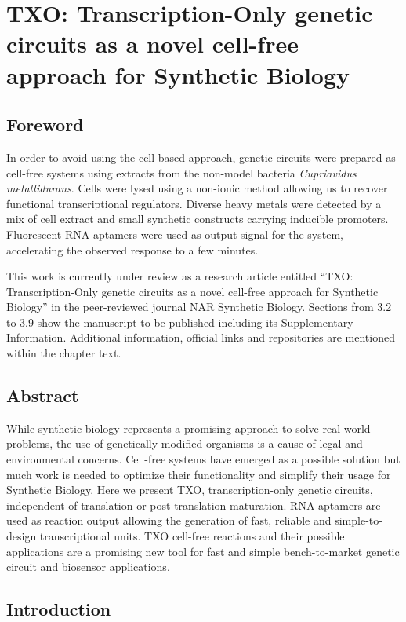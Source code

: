 \chapter{TXO: Transcription-Only genetic circuits as a novel cell-free approach for Synthetic Biology}

\section{Foreword}

In order to avoid using the cell-based approach, genetic circuits were prepared as cell-free systems using extracts from the non-model bacteria \textit{Cupriavidus metallidurans}. Cells were lysed using a non-ionic method allowing us to recover functional transcriptional regulators. Diverse heavy metals were detected by a mix of cell extract and small synthetic constructs carrying inducible promoters. Fluorescent RNA aptamers were used as output signal for the system, accelerating the observed response to a few minutes.

This work is currently under review as a research article entitled “TXO: Transcription-Only genetic circuits as a novel cell-free approach for Synthetic Biology” in the peer-reviewed journal NAR Synthetic Biology. Sections from 3.2 to 3.9 show the manuscript to be published including its Supplementary Information. Additional information, official links and repositories are mentioned within the chapter text. 

\section{Abstract }

While synthetic biology represents a promising approach to solve real-world problems, the use of genetically modified organisms is a cause of legal and environmental concerns. Cell-free systems have emerged as a possible solution but much work is needed to optimize their functionality and simplify their usage for Synthetic Biology. Here we present TXO, transcription-only genetic circuits, independent of translation or post-translation maturation. RNA aptamers are used as reaction output allowing the generation of fast, reliable and simple-to-design transcriptional units. TXO cell-free reactions and their possible applications are a promising new tool for fast and simple bench-to-market genetic circuit and biosensor applications.


\section{Introduction}

